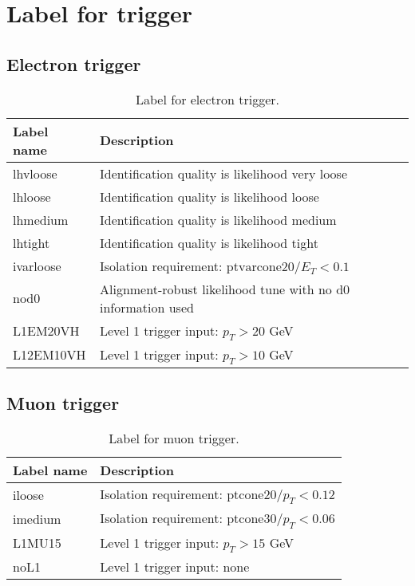 \chapter{Label for trigger \cite{trigger}}
\label{ch:appendixTwo}

\section{Electron trigger}

\begin{table}[htbp]
\begin{center}
\begin{tabular}{|l|l|}
\hline
Label name & Description \\
\hline
\hline
lhvloose & Identification quality is likelihood very loose \\
\hline
lhloose & Identification quality is likelihood loose \\
\hline
lhmedium & Identification quality is likelihood medium \\
\hline
lhtight & Identification quality is likelihood tight \\
\hline
ivarloose & Isolation requirement: $\text{ptvarcone20} / E_T < 0.1$ \\
\hline
nod0 & Alignment-robust likelihood tune with no d0 information used \\
\hline
L1EM20VH & Level 1 trigger input: $p_T > 20$ GeV \\
\hline
L12EM10VH & Level 1 trigger input: $p_T > 10$ GeV \\
\hline
\end{tabular}
\end{center}
\caption{Label for electron trigger.}
\end{table}

\section{Muon trigger}

\begin{table}[htbp]
\begin{center}
\begin{tabular}{|l|l|}
\hline
Label name & Description \\
\hline
\hline
iloose & Isolation requirement: $\text{ptcone20} / p_T < 0.12$ \\
\hline
imedium & Isolation requirement: $\text{ptcone30} / p_T < 0.06$ \\
\hline
L1MU15 & Level 1 trigger input: $p_T > 15$ GeV \\
\hline
noL1 & Level 1 trigger input: none \\
\hline
\end{tabular}
\end{center}
\caption{Label for muon trigger.}
\end{table}
